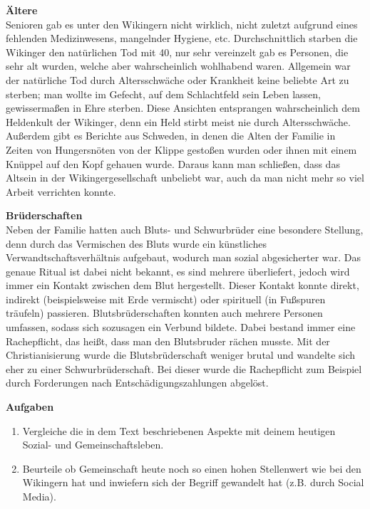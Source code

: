 \documentclass[12pt,a4paper,ngerman,openany]{book}
\newcommand{\aufgaben}[1]{
  \begin{tcolorbox}
    \textbf{Aufgaben}
    \begin{enumerate}
      #1
    \end{enumerate}
  \end{tcolorbox}
} %
\begin{document}
\textbf{Ältere}\\
Senioren gab es unter den Wikingern nicht wirklich, nicht zuletzt aufgrund eines
fehlenden Medizinwesens, mangelnder Hygiene, etc. Durchschnittlich starben die Wikinger
den natürlichen Tod mit 40, nur sehr vereinzelt gab es Personen, die sehr alt wurden, welche aber wahrscheinlich wohlhabend waren. Allgemein war der natürliche Tod durch Altersschwäche oder Krankheit keine beliebte Art zu sterben; man wollte im Gefecht, auf dem Schlachtfeld sein Leben lassen, gewissermaßen \glqq in Ehre\grqq{} sterben. Diese Ansichten entsprangen wahrscheinlich dem Heldenkult der Wikinger, denn ein Held stirbt meist nie durch Altersschwäche. Außerdem gibt es Berichte aus Schweden, in denen die Alten der Familie in Zeiten von Hungersnöten von der Klippe gestoßen wurden oder ihnen mit einem Knüppel auf den Kopf gehauen wurde. Daraus kann man schließen, dass das \glqq Altsein\grqq{} in der Wikingergesellschaft unbeliebt war, auch da man nicht mehr so viel Arbeit verrichten konnte.

\textbf{Brüderschaften}\\
Neben der Familie hatten auch Bluts- und Schwurbrüder eine besondere Stellung, denn
durch das Vermischen des Bluts wurde ein künstliches Verwandtschaftsverhältnis aufgebaut,
wodurch man sozial abgesicherter war. Das genaue Ritual ist dabei nicht bekannt, es sind mehrere überliefert, jedoch wird immer ein Kontakt zwischen dem Blut hergestellt. Dieser Kontakt konnte direkt, indirekt (beispielsweise mit Erde vermischt) oder spirituell (in Fußspuren träufeln) passieren. Blutsbrüderschaften konnten auch mehrere Personen umfassen, sodass sich sozusagen ein Verbund bildete.
Dabei bestand immer eine Rachepflicht, das heißt, dass man den Blutsbruder rächen musste. Mit der Christianisierung wurde die Blutsbrüderschaft weniger brutal und wandelte sich eher zu einer Schwurbrüderschaft. Bei dieser wurde die Rachepflicht zum Beispiel durch Forderungen nach Entschädigungszahlungen abgelöst.

\aufgaben{
  \item Vergleiche die in dem Text beschriebenen Aspekte mit deinem heutigen Sozial- und Gemeinschaftsleben.
  \item Beurteile ob \glqq Gemeinschaft\grqq{} heute noch so einen hohen Stellenwert wie bei den Wikingern hat und inwiefern sich der Begriff gewandelt hat (z.B. durch Social Media).
}
\end{document}

